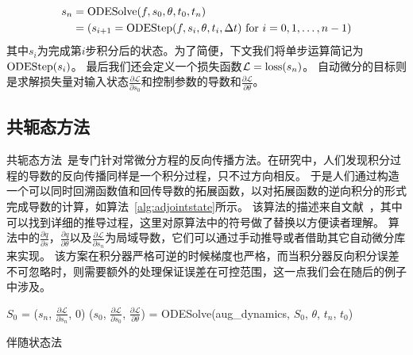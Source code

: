 \documentclass[A4,twoside,UTF8]{ctexart}
\begin{document}
\begin{align}
    \begin{split}
    s_n &= \text{ODESolve}(f, s_0, \theta, t_0, t_n)\\
        &= (s_{i+1} = {\rm ODEStep}(f, s_{i}, \theta, t_i, \Delta t) ~\text{for $i=0,1, \ldots, n-1$})
    \end{split}
\end{align}
其中$s_i$为完成第$i$步积分后的状态。为了简便，下文我们将单步运算简记为${\rm ODEStep}(s_{i})$。
最后我们还会定义一个损失函数$\mathcal{L} = {\rm loss}(s_n)$。
    自动微分的目标则是求解损失量对输入状态$\frac{\partial \mathcal{L}}{\partial s_0}$和控制参数的导数和$\frac{\partial \mathcal{L}}{\partial \theta}$。

\subsection{共轭态方法}
    共轭态方法~\cite{Plessix2006,Chen2018}是专门针对常微分方程的反向传播方法。在研究中，人们发现积分过程的导数的反向传播同样是一个积分过程，只不过方向相反。
    于是人们通过构造一个可以同时回溯函数值和回传导数的拓展函数，以对拓展函数的逆向积分的形式完成导数的计算，如算法~\ref{alg:adjointstate}所示。
该算法的描述来自文献~\cite{Chen2018}，其中可以找到详细的推导过程，这里对原算法中的符号做了替换以方便读者理解。
算法中的$\frac{\partial q}{\partial s}$，$\frac{\partial q}{\partial \theta}$以及$\frac{\partial \mathcal{L}}{\partial s_n}$为局域导数，它们可以通过手动推导或者借助其它自动微分库来实现。
该方案在积分器严格可逆的时候梯度也严格，而当积分器反向积分误差不可忽略时，则需要额外的处理保证误差在可控范围，这一点我们会在随后的例子中涉及。
\begin{algorithm}
    \SetAlgoLined
    \DontPrintSemicolon
        $S_0$ = ($s_n$, $\frac{\partial \mathcal{L}}{\partial s_n}$, $0$) 
        ($s_0$, $\frac{\partial \mathcal{L}}{\partial s_0}$, $\frac{\partial \mathcal{L}}{\partial \theta}$) = ODESolve(aug\_dynamics, $S_0$, $\theta$, $t_n$, $t_0$) 
    \caption{伴随状态法}\label{alg:adjointstate}
\end{algorithm}
\end{document}
